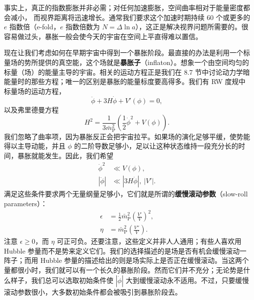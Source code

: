 事实上，真正的指数膨胀并非必需；对任何加速膨胀，空间曲率相对于能量密度都会减小，
而视界距离将迅速增长。通常我们要求这个加速时期持续 60 个或更多的 $e$ 指数倍（e-fold，$e$ 指数倍数为 $N=\Delta\ln a$），这正是解决视界问题所需要的。很容易做过头，暴胀一般会使今天的宇宙在空间上平直得难以置信。

现在让我们考虑如何在早期宇宙中得到一个暴胀阶段。最直接的办法是利用一个标量场的势所提供的真空能，这个场就是\textbf{暴胀子}（inflaton）。想象一个由空间均匀的标量（场）的能量主导的宇宙。相关的运动方程正是我们在 8.7 节中讨论动力学暗能量时的那些方程；唯一的区别是暴胀的能量标度要高得多。我们有 RW 度规中标量场的运动方程，
\begin{equation*}
\ddot{\phi} + 3H\dot{\phi} + V'(\phi) = 0,
\tag{8.191}
\end{equation*}
以及弗里德曼方程
\begin{equation*}
H^{2} = \frac{1}{3\bar{m}_{\mathrm{P}}^{2}}\left(\frac{1}{2}\dot{\phi}^{2} + V(\phi)\right).
\tag{8.192}
\end{equation*}
我们忽略了曲率项，因为暴胀反正会把宇宙拉平。如果场的演化足够平缓，使势能得以主导动能，并且 $\phi$ 的二阶导数足够小，足以让这种状态维持一段充分长的时间，暴胀就能发生。因此，我们希望
\begin{equation*}
\begin{aligned}
\dot{\phi}^{2} &\ll V(\phi), \\
|\ddot{\phi}| &\ll |3H\dot{\phi}|,\ |V'|.
\end{aligned}
\tag{8.193}
\end{equation*}
满足这些条件要求两个无量纲量足够小，它们就是所谓的\textbf{缓慢滚动参数}（slow-roll parameters）：
\begin{equation*}
\begin{aligned}
\epsilon &= \frac{1}{2}\bar{m}_{\mathrm{P}}^{2}\left(\frac{V'}{V}\right)^{2}, \\
\eta &= \bar{m}_{\mathrm{P}}^{2}\left(\frac{V''}{V}\right).
\end{aligned}
\tag{8.194}
\end{equation*}
注意 $\epsilon\ge 0$，而 $\eta$ 可正可负。还要注意，这些定义并非人人通用；有些人喜欢用 Hubble 参量而不是势来定义它们。我们的选择描述的是场是否有机会缓慢滚动一阵子；而用 Hubble 参量的描述给出的则是场实际上是否正在缓慢滚动。当这两个量都很小时，我们就可以有一个长久的暴胀阶段。然而它们并不充分；无论势是什么样子，我们总可以选取初始条件使 $|\dot{\phi}|$ 大到缓慢滚动永不适用。不过，只要缓慢滚动参数很小，大多数初始条件都会被吸引到暴胀阶段去。

